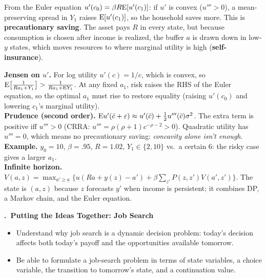 \documentclass[11pt]{article}
\newcounter{qn}
\newcommand{\question}[1]{\par\needspace{14\baselineskip}\refstepcounter{qn}\medskip
{\bfseries\color{ink}\large \theqn.\ #1}\par\smallskip}
\begin{document}
\begin{resp}
\begin{minipage}[t]{0.62\textwidth}\vspace{0pt}
From the Euler equation $u'(c_0)=\beta R\mathrm{E}[u'(c_1)]$: if $u'$ is convex ($u'''>0$), a mean-preserving spread in $Y_1$ raises $\mathrm{E}[u'(c_1)]$, so the household saves more. This is \textbf{precautionary saving}. The asset pays $R$ in every state, but because consumption is chosen after income is realized, the buffer $a$ is drawn down in low-$y$ states, which moves resources to where marginal utility is high (\textbf{self-insurance}).
\end{minipage}\hfill
\begin{minipage}[t]{0.34\textwidth}\vspace{0pt}\centering
\scalebox{0.75}{\figPrecaution}
\end{minipage}
\end{resp}
\begin{intu}
\textbf{Jensen on $u'$.} For log utility $u'(c)=1/c$, which is convex, so $\mathrm{E}\big[\frac{1}{Ra_1+Y_1}\big]>\frac{1}{Ra_1+\mathrm{E} Y_1}$. At any fixed $a_1$, risk raises the RHS of the Euler equation, so the optimal $a_1$ must rise to restore equality (raising $u'(c_0)$ and lowering $c_1$'s marginal utility).\\
\textbf{Prudence (second order).} $\mathrm{E} u'(\bar c+\varepsilon)\approx u'(\bar c)+\tfrac12u'''(\bar c)\sigma^2$. The extra term is positive iff $u'''>0$ (CRRA: $u'''=\rho(\rho+1)c^{-\rho-2}>0$). Quadratic utility has $u'''=0$, which means no precautionary saving: \emph{concavity alone isn't enough}.\\
\textbf{Example.} $y_0=10$, $\beta=.95$, $R=1.02$, $Y_1\in\{2,10\}$ vs.\ a certain 6: the risky case gives a larger $a_1$.\\
\textbf{Infinite horizon.} $V(a,z)=\max_{a'\ge\underline a}\{u(Ra+y(z)-a')+\beta\sum_{z'}P(z,z')V(a',z')\}$. The state is $(a,z)$ because $z$ forecasts $y'$ when income is persistent; it combines DP, a Markov chain, and the Euler equation.
\end{intu}

\question{Putting the Ideas Together: Job Search}
\begin{itemize}[leftmargin=1.2em,itemsep=0pt]\itshape
\item Understand why job search is a dynamic decision problem: today's decision affects both today's payoff and the opportunities available tomorrow.
\item Be able to formulate a job-search problem in terms of state variables, a choice variable, the transition to tomorrow's state, and a continuation value.
\end{itemize}
\end{document}
